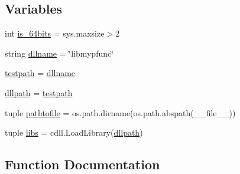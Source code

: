 \subsection*{Variables}
\begin{DoxyCompactItemize}
\item 
int \hyperlink{namespace_uni_dec_1_1unidec__modules_1_1unidectools_ad957a446a7c0f48f5e7286f14bfff315}{is\+\_\+64bits} = sys.\+maxsize$>$2
\item 
string \hyperlink{namespace_uni_dec_1_1unidec__modules_1_1unidectools_ae66866441c136f780ba16b7f8daff0e0}{dllname} = \char`\"{}libmypfunc\char`\"{}
\item 
\hyperlink{namespace_uni_dec_1_1unidec__modules_1_1unidectools_a40483a241ff502b9ffa3ad3ae0b4d0d2}{testpath} = \hyperlink{namespace_uni_dec_1_1unidec__modules_1_1unidectools_ae66866441c136f780ba16b7f8daff0e0}{dllname}
\item 
\hyperlink{namespace_uni_dec_1_1unidec__modules_1_1unidectools_a1c5e20c347cb5bcedac39f29d819a47e}{dllpath} = \hyperlink{namespace_uni_dec_1_1unidec__modules_1_1unidectools_a40483a241ff502b9ffa3ad3ae0b4d0d2}{testpath}
\item 
tuple \hyperlink{namespace_uni_dec_1_1unidec__modules_1_1unidectools_a9a79928662ea12905691072a1c712414}{pathtofile} = os.\+path.\+dirname(os.\+path.\+abspath(\+\_\+\+\_\+file\+\_\+\+\_\+))
\item 
tuple \hyperlink{namespace_uni_dec_1_1unidec__modules_1_1unidectools_ad22807c824de9a59ef9fe437ea81bbe5}{libs} = cdll.\+Load\+Library(\hyperlink{namespace_uni_dec_1_1unidec__modules_1_1unidectools_a1c5e20c347cb5bcedac39f29d819a47e}{dllpath})
\end{DoxyCompactItemize}


\subsection{Function Documentation}
\hypertarget{namespace_uni_dec_1_1unidec__modules_1_1unidectools_a19dde6bcac6011919b9c4fc3a8f52a1c}{}
